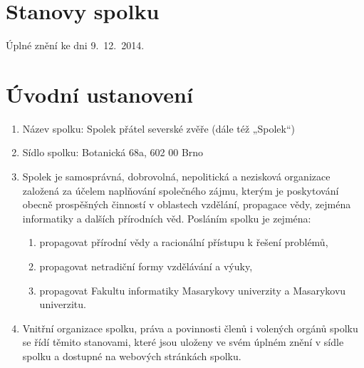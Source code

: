 \documentclass[11pt,a4paper]{article}
\begin{document}
\section*{\Huge{}Stanovy spolku}

Úplné znění ke dni 9.\ 12.\ 2014.

\section{Úvodní ustanovení}
\begin{enumerate}[itemsep=0pt]
    \item Název spolku: Spolek přátel severské zvěře (dále též „Spolek“)
    \item Sídlo spolku: Botanická 68a, 602 00 Brno
    \item Spolek je samosprávná, dobrovolná, nepolitická a nezisková organizace 
    založená za účelem naplňování společného zájmu, kterým je poskytování obecně
    prospěšných činností v oblastech vzdělání, propagace vědy, zejména 
    informatiky a dalších přírodních věd. Posláním spolku je zejména: 
    \begin{enumerate}[itemsep=0pt,topsep=0pt]
        \item propagovat přírodní vědy a racionální přístupu k řešení problémů,
        \item propagovat netradiční formy vzdělávání a výuky,
        \item propagovat Fakultu informatiky Masarykovy univerzity a Masarykovu univerzitu.
    \end{enumerate}
    \item Vnitřní organizace spolku, práva a povinnosti členů i volených orgánů 
    spolku se řídí těmito stanovami, které jsou uloženy ve svém úplném znění 
    v sídle spolku a dostupné na webových stránkách spolku.
\end{enumerate}
\end{document}
